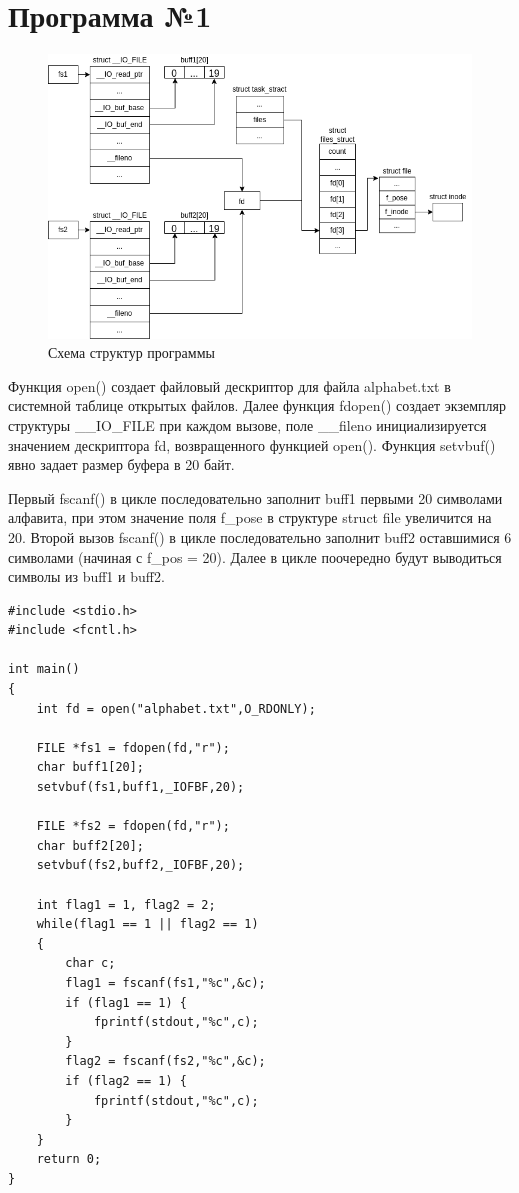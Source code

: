 \documentclass[14pt,a4paper]{scrreprt}
\begin{document}


\thispagestyle{empty}

\chapter{Программа №1}

\begin{figure}[H]
	\begin{center}
		\includegraphics[scale=0.67]{assets/dCIO.png}
	\end{center}
	\caption{Схема структур программы}
\end{figure}

Функция open() создает файловый дескриптор для файла alphabet.txt в системной таблице открытых файлов. Далее функция fdopen() создает экземпляр структуры \_\_IO\_FILE при каждом вызове, поле \_\_fileno инициализируется значением дескриптора fd, возвращенного функцией open(). Функция setvbuf() явно задает размер буфера в 20 байт.

Первый fscanf() в цикле последовательно заполнит buff1 первыми 20 символами алфавита, при этом значение поля f\_pose в структуре struct file увеличится на 20. Второй вызов fscanf() в цикле последовательно заполнит buff2 оставшимися 6 символами (начиная с f\_pos = 20). Далее в цикле поочередно будут выводиться символы из buff1 и buff2.

\newpage
\begin{lstlisting}[caption=Исходная программа]
#include <stdio.h>
#include <fcntl.h>

int main()
{
	int fd = open("alphabet.txt",O_RDONLY);
	
	FILE *fs1 = fdopen(fd,"r");
	char buff1[20];
	setvbuf(fs1,buff1,_IOFBF,20);
	
	FILE *fs2 = fdopen(fd,"r");
	char buff2[20];
	setvbuf(fs2,buff2,_IOFBF,20);
	
	int flag1 = 1, flag2 = 2;
	while(flag1 == 1 || flag2 == 1)
	{
		char c;
		flag1 = fscanf(fs1,"%c",&c);
		if (flag1 == 1) {
			fprintf(stdout,"%c",c);
		}
		flag2 = fscanf(fs2,"%c",&c);
		if (flag2 == 1) { 
			fprintf(stdout,"%c",c); 
		}
	}
	return 0;
}
\end{lstlisting}
\end{document}
